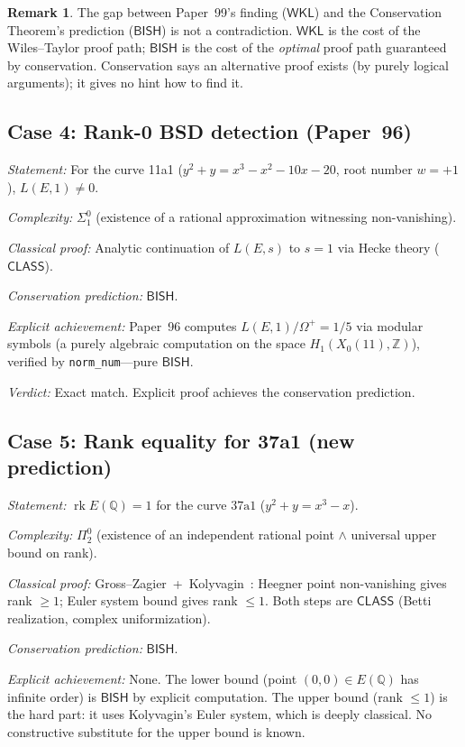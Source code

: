 \documentclass[11pt,a4paper]{article}
\theoremstyle{plain}
\theoremstyle{definition}
\newtheorem{remark}[theorem]{Remark}
\newcommand{\BISH}{\textsf{BISH}}
\newcommand{\WKL}{\textsf{WKL}}
\newcommand{\CLASS}{\textsf{CLASS}}
\newcommand{\Z}{\mathbb{Z}}
\newcommand{\Q}{\mathbb{Q}}
\DeclareMathOperator{\rk}{rk}
\begin{document}
\begin{remark}
The gap between Paper~99's finding ($\WKL$) and the Conservation Theorem's prediction ($\BISH$) is not a contradiction.  $\WKL$ is the cost of the Wiles--Taylor proof path; $\BISH$ is the cost of the \emph{optimal} proof path guaranteed by conservation.  Conservation says an alternative proof exists (by purely logical arguments); it gives no hint how to find it.
\end{remark}

\subsection{Case 4: Rank-0 BSD detection (Paper~96)}

\emph{Statement:} For the curve 11a1 ($y^2 + y = x^3 - x^2 - 10x - 20$, root number $w = +1$), $L(E,1) \ne 0$.

\emph{Complexity:} $\Sigma^0_1$ (existence of a rational approximation witnessing non-vanishing).

\emph{Classical proof:} Analytic continuation of $L(E,s)$ to $s = 1$ via Hecke theory ($\CLASS$).

\emph{Conservation prediction:} $\BISH$.

\emph{Explicit achievement:} Paper~96 computes $L(E,1)/\Omega^+ = 1/5$ via modular symbols (a purely algebraic computation on the space $H_1(X_0(11), \Z)$), verified by \texttt{norm\_num}---pure $\BISH$.

\emph{Verdict:} Exact match.  Explicit proof achieves the conservation prediction.

\subsection{Case 5: Rank equality for 37a1 (new prediction)}

\emph{Statement:} $\rk E(\Q) = 1$ for the curve $37\mathrm{a}1$ ($y^2 + y = x^3 - x$).

\emph{Complexity:} $\Pi^0_2$ (existence of an independent rational point $\land$ universal upper bound on rank).

\emph{Classical proof:} Gross--Zagier~+~Kolyvagin~\cite{kolyvagin1990}: Heegner point non-vanishing gives rank $\ge 1$; Euler system bound gives rank $\le 1$.  Both steps are $\CLASS$ (Betti realization, complex uniformization).

\emph{Conservation prediction:} $\BISH$.

\emph{Explicit achievement:} None.  The lower bound (point $(0,0) \in E(\Q)$ has infinite order) is $\BISH$ by explicit computation.  The upper bound (rank $\le 1$) is the hard part: it uses Kolyvagin's Euler system, which is deeply classical.  No constructive substitute for the upper bound is known.
\end{document}
